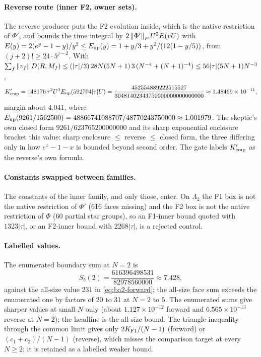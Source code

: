 \paragraph{Reverse route (inner F2, owner sets).} The reverse producer puts the
F2 evolution inside, which is the native restriction of $\Phi'$, and bounds
the time integral by $2\left\lVert\Phi'\right\rVert_FU^2E(vU)$ with
$E(y)=2(e^y-1-y)/y^2\le E_{\rm up}(y)=1+y/3+y^2/(12(1-y/5))$, from
$(j+2)!\ge24\cdot5^{j-2}$. With
$\sum_f\left\lVert v_f\right\rVert D(R,M_f)\le(|\tau|/3)\,28N(5N+1)\,3\,(N^{-4}+(N+1)^{-4})\le
56|\tau|(5N+1)N^{-3}$,
\begin{equation}
 K'_{\rm cmp}=148176\,\tau^2U^2E_{\rm up}(592704|\tau|U)
 =\frac{452554889222515527}{30481402343750000000000000000}\approx
 1.48469\times10^{-11},
 \label{eq:ba2-Kcmp-rev}
\end{equation}
margin about $4.041$, where
$E_{\rm up}(9261/1562500)=48866741088707/48770243750000\approx1.001979$.
The skeptic's own closed form $9261/623765200000000$ and its sharp
exponential enclosure bracket this value: sharp enclosure $\le$ reverse $\le$
closed form, the three differing only in how $e^x-1-x$ is bounded beyond
second order. The gate labels $K'_{\rm cmp}$ as the reverse's own formula.

\paragraph{Constants swapped between families.} The constants of the inner
family, and only those, enter. On $\Lambda_2$ the F1 box is not the native
restriction of $\Phi'$ (616 faces missing) and the F2 box is not the native
restriction of $\Phi$ (60 partial star groups), so an F1-inner bound quoted
with $1323|\tau|$, or an F2-inner bound with $2268|\tau|$, is a rejected
control.

\paragraph{Labelled values.} The enumerated boundary sum at $N=2$ is
\[
 S_b(2)=\frac{616396498531}{82978560000}\approx7.428,
\]
against the all-size value 231 in \eqref{eq:ba2-forward}; the all-size face sum exceeds the enumerated
one by factors of 20 to 31 at $N=2$ to $5$. The enumerated sums give sharper
values at small $N$ only (about $1.127\times10^{-12}$ forward and
$6.565\times10^{-13}$ reverse at $N=2$); the headline is the all-size bound.
The triangle inequality through the common limit gives only
$2K_{\rm F1}/(N-1)$ (forward) or $(c_1+c_2)/(N-1)$ (reverse), which misses
the comparison target at every $N\ge2$; it is retained as a labelled weaker
bound.

